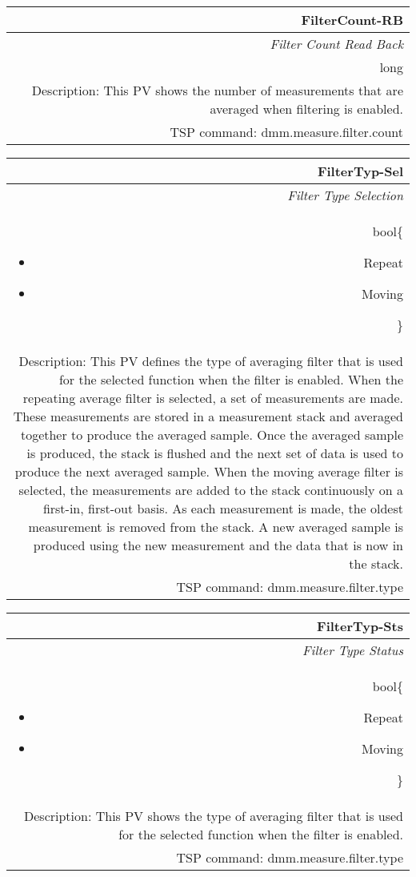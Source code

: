 \documentclass[openany]{article}
\begin{document}
		\begin{tabular}{N}
			\hline
			\bfseries FilterCount-RB\label{pv:filtercount-rb} \\ \hline
			\emph{Filter Count Read Back} \\
			long \\
			Description: This PV shows the number of measurements that are averaged when filtering is enabled. \\
			TSP command: dmm.measure.filter.count
		\end{tabular}

		\begin{tabular}{N}
			\hline
			\bfseries FilterTyp-Sel\label{pv:filtertyp-sel} \\ \hline
			\emph{Filter Type Selection} \\
			bool\{\begin{itemize}[noitemsep]
				\item[] Repeat
				\item[] Moving
			\end{itemize}\} \\
			Description: This PV defines the type of averaging filter that is used for the selected function when the filter is enabled. When the repeating average filter is selected, a set of measurements are made. These measurements are stored in a measurement stack and averaged together to produce the averaged sample. Once the averaged sample is produced, the stack is flushed and the next set of data is used to produce the next averaged sample. When the moving average filter is selected, the measurements are added to the stack continuously on a first-in, first-out basis. As each measurement is made, the oldest measurement is removed from the stack. A new averaged sample is produced using the new measurement and the data that is now in the stack. \\
			TSP command: dmm.measure.filter.type
		\end{tabular}

		\begin{tabular}{N}
			\hline
			\bfseries FilterTyp-Sts\label{pv:filtertyp-sts} \\ \hline
			\emph{Filter Type Status} \\
			bool\{\begin{itemize}[noitemsep]
				\item[] Repeat
				\item[] Moving
			\end{itemize}\} \\
			Description: This PV shows the type of averaging filter that is used for the selected function when the filter is enabled. \\
			TSP command: dmm.measure.filter.type
			\end{tabular}
\end{document}

